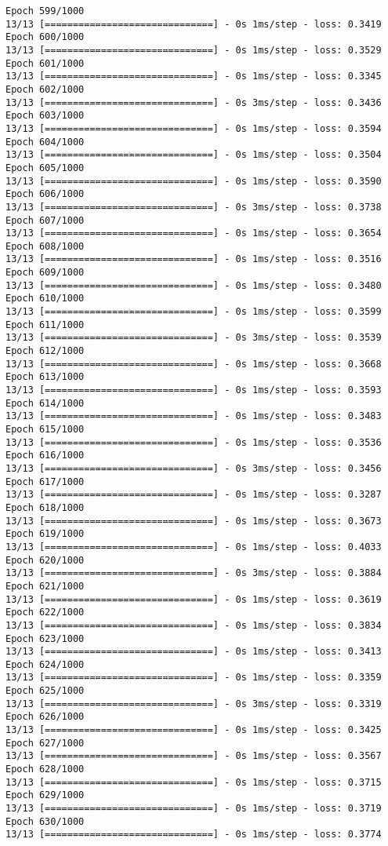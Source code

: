 \documentclass[11pt]{article}
\begin{document}
\begin{Verbatim}[commandchars=\\\{\}]
Epoch 599/1000
13/13 [==============================] - 0s 1ms/step - loss: 0.3419
Epoch 600/1000
13/13 [==============================] - 0s 1ms/step - loss: 0.3529
Epoch 601/1000
13/13 [==============================] - 0s 1ms/step - loss: 0.3345
Epoch 602/1000
13/13 [==============================] - 0s 3ms/step - loss: 0.3436
Epoch 603/1000
13/13 [==============================] - 0s 1ms/step - loss: 0.3594
Epoch 604/1000
13/13 [==============================] - 0s 1ms/step - loss: 0.3504
Epoch 605/1000
13/13 [==============================] - 0s 1ms/step - loss: 0.3590
Epoch 606/1000
13/13 [==============================] - 0s 3ms/step - loss: 0.3738
Epoch 607/1000
13/13 [==============================] - 0s 1ms/step - loss: 0.3654
Epoch 608/1000
13/13 [==============================] - 0s 1ms/step - loss: 0.3516
Epoch 609/1000
13/13 [==============================] - 0s 1ms/step - loss: 0.3480
Epoch 610/1000
13/13 [==============================] - 0s 1ms/step - loss: 0.3599
Epoch 611/1000
13/13 [==============================] - 0s 3ms/step - loss: 0.3539
Epoch 612/1000
13/13 [==============================] - 0s 1ms/step - loss: 0.3668
Epoch 613/1000
13/13 [==============================] - 0s 1ms/step - loss: 0.3593
Epoch 614/1000
13/13 [==============================] - 0s 1ms/step - loss: 0.3483
Epoch 615/1000
13/13 [==============================] - 0s 1ms/step - loss: 0.3536
Epoch 616/1000
13/13 [==============================] - 0s 3ms/step - loss: 0.3456
Epoch 617/1000
13/13 [==============================] - 0s 1ms/step - loss: 0.3287
Epoch 618/1000
13/13 [==============================] - 0s 1ms/step - loss: 0.3673
Epoch 619/1000
13/13 [==============================] - 0s 1ms/step - loss: 0.4033
Epoch 620/1000
13/13 [==============================] - 0s 3ms/step - loss: 0.3884
Epoch 621/1000
13/13 [==============================] - 0s 1ms/step - loss: 0.3619
Epoch 622/1000
13/13 [==============================] - 0s 1ms/step - loss: 0.3834
Epoch 623/1000
13/13 [==============================] - 0s 1ms/step - loss: 0.3413
Epoch 624/1000
13/13 [==============================] - 0s 1ms/step - loss: 0.3359
Epoch 625/1000
13/13 [==============================] - 0s 3ms/step - loss: 0.3319
Epoch 626/1000
13/13 [==============================] - 0s 1ms/step - loss: 0.3425
Epoch 627/1000
13/13 [==============================] - 0s 1ms/step - loss: 0.3567
Epoch 628/1000
13/13 [==============================] - 0s 1ms/step - loss: 0.3715
Epoch 629/1000
13/13 [==============================] - 0s 1ms/step - loss: 0.3719
Epoch 630/1000
13/13 [==============================] - 0s 1ms/step - loss: 0.3774

\end{Verbatim}
\end{document}
